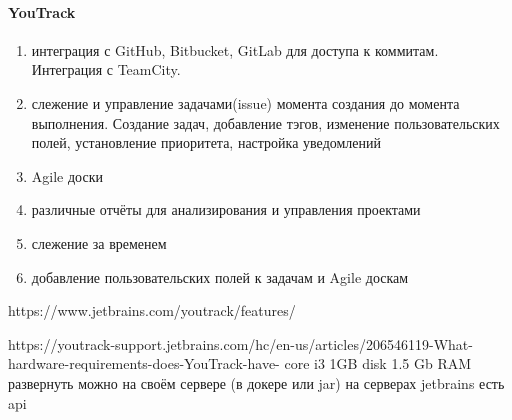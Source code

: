 \documentclass{article}
\begin{document}
\paragraph{YouTrack}
\begin{enumerate}
    \item{интеграция с GitHub, Bitbucket, GitLab для доступа к коммитам. Интеграция с TeamCity.}
    \item{слежение и управление задачами(issue) момента создания до момента выполнения. Создание задач, добавление тэгов, изменение пользовательских полей, установление приоритета, настройка уведомлений}
    \item{Agile доски}
    \item{различные отчёты для анализирования и управления проектами}
    
    \item{слежение за временем}
    \item{добавление пользовательских полей к задачам и Agile доскам}
\end{enumerate}

https://www.jetbrains.com/youtrack/features/


https://youtrack-support.jetbrains.com/hc/en-us/articles/206546119-What-hardware-requirements-does-YouTrack-have-
core i3
    1GB disk
    1.5 Gb RAM
    развернуть можно на своём сервере (в докере или jar) на серверах jetbrains
    есть api
\end{document}
